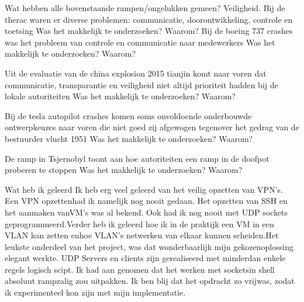  


Wat hebben alle bovenstaande rampen/ongelukken gemeen? Veiligheid.
Bij de therac waren er diverse problemen: communicatie, doorontwikkeling, controle en toetsing
Was het makkelijk te onderzoeken? Waarom?
Bij de boeing 737 crashes was het probleem van controle en communicatie naar medewerkers
Was het makkelijk te onderzoeken? Waarom?

Uit de evaluatie van de china explosion 2015 tianjin komt naar voren dat communicatie, transparantie en veiligheid niet altijd prioriteit hadden bij de lokale autoriteiten
Was het makkelijk te onderzoeken? Waarom?

Bij de tesla autopilot crashes komen soms onvoldoende onderbouwde ontwerpkeuzes naar voren die niet goed zij  afgewogen tegenover het gedrag van de bestuurder
vlucht 1951
Was het makkelijk te onderzoeken? Waarom?

De ramp in Tsjernobyl toont aan hoe autoriteiten een ramp in de doofpot proberen te stoppen
Was het makkelijk te onderzoeken? Waarom?



Wat heb ik geleerd
Ik heb erg veel geleerd van het veilig opzetten van VPN’s. Een VPN opzettenhad ik namelijk nog nooit gedaan. Het opzetten van SSH en het aanmaken vanVM’s was al bekend. Ook had ik nog nooit met UDP sockets geprogrammeerd.Verder heb ik geleerd hoe ik in de praktijk een VM in een VLAN kan zetten enhoe VLAN’s netwerken van elkaar kunnen scheiden.Het leukste onderdeel van het project, was dat wonderbaarlijk mijn gekozenoplossing elegant werkte. UDP Servers en clients zijn gerealiseerd met minderdan enkele regels logisch scipt. Ik had aan genomen dat het werken met socketsin shell absoluut rampzalig zou uitpakken. Ik ben blij dat het opdracht zo vrijwas, zodat ik experimenteel kon zijn met mijn implementatie.



